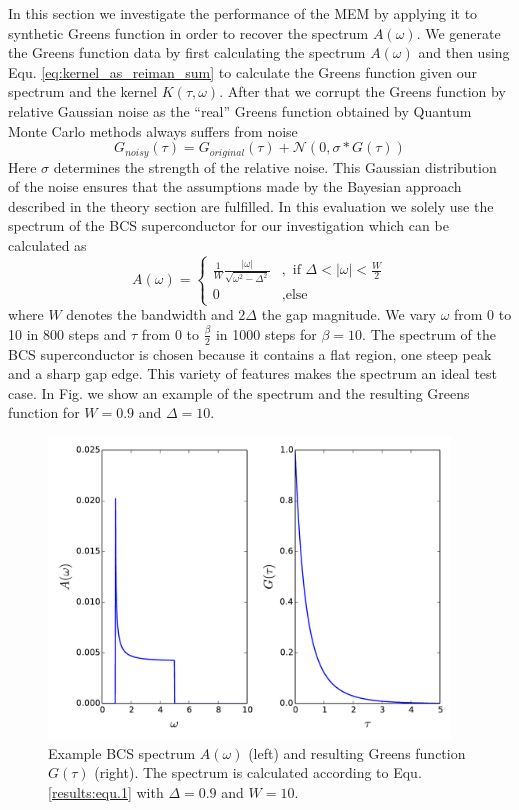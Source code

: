 In this section we investigate the performance of the MEM by applying it to synthetic Greens function in order to recover the spectrum $A(\omega)$.
We generate the Greens function data by first calculating the spectrum $A(\omega)$ and then using Equ. \ref{eq:kernel_as_reiman_sum} to calculate the Greens function given our spectrum and the kernel $K(\tau,\omega)$.
After that we corrupt the Greens function by relative Gaussian noise as the ``real'' Greens function obtained by Quantum Monte Carlo methods always suffers from noise
\begin{equation}
	G_{noisy}(\tau) = G_{original}(\tau) + \mathcal{N}(0,\sigma*G(\tau))
\end{equation}
Here $\sigma$ determines the strength of the relative noise.
This Gaussian distribution of the noise ensures that the assumptions made by the Bayesian approach described in the theory section are fulfilled.
In this evaluation we solely use the spectrum of the BCS superconductor for our investigation which can be calculated as
\begin{equation}
	A(\omega) = 
		\begin{cases}
			\frac{1}{W} \frac{|\omega|}{\sqrt{\omega^2 - \Delta^2}}&, \text{ if } \Delta < |\omega| < \frac{W}{2} \\
			0 &, \text{else}
		\end{cases}
	\label{results:equ.1}
\end{equation}
where $W$ denotes the bandwidth and $2\Delta$ the gap magnitude. We vary $\omega$ from 0 to 10 in 800 steps and $\tau$ from 0 to $\frac{\beta}{2}$ in 1000 steps for $\beta = 10$. The spectrum of the BCS superconductor is chosen because it contains a flat region, one steep peak and a sharp gap edge. This variety of features makes the spectrum an ideal test case.
In Fig. we show an example of the spectrum and the resulting Greens function for $W = 0.9$ and $\Delta = 10$.
\begin{figure}[htbp]
	\centering
	\includegraphics[width=0.95\textwidth]{./images/BCS_A_G_example.pdf}
	\caption{Example BCS spectrum $A(\omega)$ (left) and resulting Greens function $G(\tau)$ (right). The spectrum is calculated according to Equ. \ref{results:equ.1} with $\Delta = 0.9$ and $W = 10$.}
	\label{results:fig.1}
\end{figure}
\FloatBarrier
